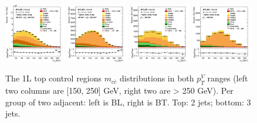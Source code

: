 \begin{figure}[h!]
\includegraphics[width=0.24\textwidth]{Images/VH/SRsandTopCRs/Region_distmBB_DtopCRBL_BMax250_L1_Y6051_TTypebl_T1_J3_BMin150_Prefit.png}
\includegraphics[width=0.24\textwidth]{Images/VH/SRsandTopCRs/Region_distmBB_DtopCRBC_BMax250_L1_Y6051_TTypebt_T1_J3_BMin150_Prefit.png}
\includegraphics[width=0.24\textwidth]{Images/VH/SRsandTopCRs/Region_distmBB_DtopCRBL_L1_Y6051_TTypebl_T1_J3_BMin250_Prefit.png}
\includegraphics[width=0.24\textwidth]{Images/VH/SRsandTopCRs/Region_distmBB_DtopCRBC_L1_Y6051_TTypebt_T1_J3_BMin250_Prefit.png}
\caption{The 1L top control regions $m_{c\bar{c}}$ distributions in both $p_T^V$ ranges (left two columns are [150, 250] GeV, right two are > 250 GeV). Per group of two adjacent: left is BL, right is BT. Top: 2 jets; bottom: 3 jets.} 
\label{fig:topCRslowptv}
\end{figure}

